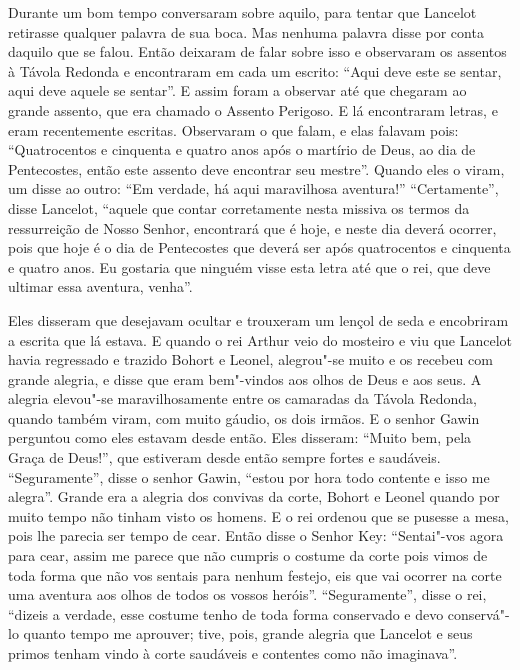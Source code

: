 Durante um bom tempo conversaram sobre aquilo, para tentar que Lancelot
retirasse qualquer palavra de sua boca. Mas nenhuma palavra disse por conta
daquilo que se falou. Então deixaram de falar sobre isso e observaram os
assentos à Távola Redonda e encontraram em cada um escrito: “Aqui deve este se
sentar, aqui deve aquele se sentar”. E assim foram a observar até que chegaram
ao grande assento, que era chamado o Assento Perigoso. E lá encontraram letras,
e eram recentemente escritas. Observaram o que falam, e elas falavam pois: 
“Quatrocentos e cinquenta e quatro anos após o martírio de Deus, ao dia de
Pentecostes, então este assento deve encontrar seu mestre”. Quando eles o
viram, um disse ao outro: “Em verdade, há aqui maravilhosa aventura!”
“Certamente”, disse Lancelot, “aquele que contar corretamente nesta missiva os
termos da ressurreição de Nosso Senhor, encontrará que é hoje, e neste dia
deverá ocorrer, pois que hoje é o dia de Pentecostes que deverá ser após
quatrocentos e cinquenta e quatro anos. Eu gostaria que ninguém visse esta
letra até que o rei, que deve ultimar essa aventura, venha”. 

Eles disseram que desejavam ocultar e trouxeram um lençol de seda e encobriram a
escrita que lá estava. E quando o rei Arthur veio do mosteiro e viu que
Lancelot havia regressado e trazido Bohort e Leonel, alegrou"-se muito e os
recebeu com grande alegria, e disse que eram bem"-vindos aos olhos de Deus e aos
seus. A alegria elevou"-se maravilhosamente entre os camaradas da Távola
Redonda, quando também viram, com muito gáudio, os dois irmãos. E o senhor
Gawin perguntou como eles estavam desde então. Eles disseram: “Muito bem, pela
Graça de Deus!”, que estiveram desde então sempre fortes e saudáveis.
“Seguramente”, disse o senhor Gawin, “estou por hora todo contente e isso me
alegra”. Grande era a alegria dos convivas da corte, Bohort e Leonel quando por
muito tempo não tinham visto os homens. E o rei ordenou que se pusesse a mesa,
pois lhe parecia ser tempo de cear. Então disse o Senhor Key: “Sentai"-vos agora
para cear, assim me parece que não cumpris o costume da corte pois vimos de
toda forma que não vos sentais para nenhum festejo, eis que vai ocorrer na
corte uma aventura aos olhos de todos os vossos heróis”. “Seguramente”, disse o
rei, “dizeis a verdade, esse costume tenho de toda forma conservado e devo
conservá"-lo quanto tempo me aprouver; tive, pois, grande alegria que Lancelot
e seus primos tenham vindo à corte saudáveis e contentes como não imaginava”. 

